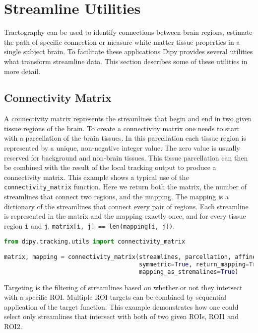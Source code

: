 \section{Streamline Utilities}

Tractography can be used to identify connections between brain regions, estimate the path of specific connection or measure white matter tissue properties in a single subject brain. To facilitate these applications Dipy provides several utilities what transform streamline data. This section describes some of these utilities in more detail.

\subsection{Connectivity Matrix}
A connectivity matrix represents the streamlines that begin and end in two given tissue regions of the brain. To create a connectivity matrix one needs to start with a parcellation of the brain tissues. In this parcellation each tissue region is represented by a unique, non-negative integer value. The zero value is usually reserved for background and non-brain tissues. This tissue parcellation can then be combined with the result of the local tracking output to produce a connectivity matrix. This example shows a typical use of the \verb|connectivity_matrix| function. Here we return both the matrix, the number of streamlines that connect two regions, and the mapping. The mapping is a dictionary of the streamlines that connect every pair of regions. Each streamline is represented in the matrix and the mapping exactly once, and for every tissue region \verb|i| and \verb|j|, \verb|matrix[i, j] == len(mapping[i, j])|.

\begin{lstlisting}[language=python]
from dipy.tracking.utils import connectivity_matrix

matrix, mapping = connectivity_matrix(streamlines, parcellation, affine=affine,
                                      symmetric=True, return_mapping=True,
                                      mapping_as_stremalines=True)
\end{lstlisting}

Targeting is the filtering of streamlines based on whether or not they intersect with a specific ROI. Multiple ROI targets can be combined by sequential application of the target function. This example demonstrates how one could select only streamlines that intersect with both of two given ROIs, ROI1 and ROI2.

